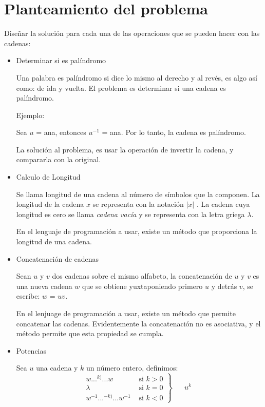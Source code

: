\documentclass[12pt]{article}
\begin{document}
	\section{Planteamiento del problema}
	Diseñar la solución para cada una de las operaciones que se pueden hacer con las cadenas:
	\begin{itemize}
		\item Determinar si es palíndromo

		Una palabra es palíndromo si dice lo mismo al derecho
		y al revés, es algo así como: de ida y vuelta. El problema
		es determinar si una cadena es palíndromo.

		Ejemplo: 

		Sea $u$ = ana, entonces $u^{-1}$ = ana. Por lo tanto, la cadena es palíndromo.

		La solución al problema, es usar la operación de invertir la cadena, y compararla
		con la original.

		\item Calculo de Longitud
		
		Se llama longitud de una cadena al número de símbolos que la componen. La longitud de la cadena $x$ se representa con la notación $|x|$ .
		La cadena cuya longitud es cero se llama \textsl{cadena 
		vacía} y se representa con la letra griega $\lambda$.

		En el lenguaje de programación a usar, existe un método que proporciona 
		la longitud de una cadena.

		\item Concatenación de cadenas

		Sean $u$ y $v$ dos cadenas sobre el mismo alfabeto, la 
		concatenación de $u$ y $v$ es una nueva cadena $w$ que se 
		obtiene yuxtaponiendo primero $u$ y detrás $v$, se
		escribe: $w$ = $uv$.

		En el lenjuage de programación a usar, existe un método que permite concatenar las
		cadenas. Evidentemente la concatenación no es asociativa, y el método permite 
		que esta propiedad se cumpla.

		\item Potencias

		Sea $u$ una cadena y $k$ un número entero, definimos:
		\begin{equation*}
			\left.
			\begin{aligned}
			w...^{k)}...w & \text{ \ \ si \ \ } k>0 \\
			\lambda & \text{ \ \ si \ \ } k=0 \\ 
			w^{-1}...^{-k)}...w^{-1} & \text{ \ \ si \ \ } k<0 
			\end{aligned}
			\right\}
			\quad\text{ $u^{k}$ }
		\end{equation*}


\end{itemize}
\end{document}
